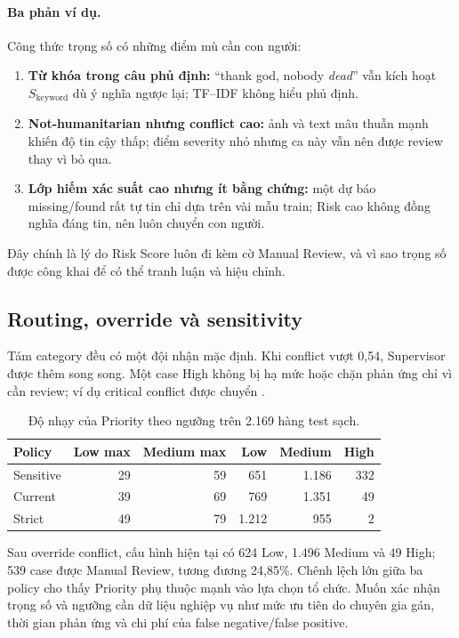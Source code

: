 \paragraph{Ba phản ví dụ.} Công thức trọng số có những điểm mù cần con người:
\begin{enumerate}[leftmargin=*]
  \item \textbf{Từ khóa trong câu phủ định:} ``thank god, nobody \emph{dead}''
        vẫn kích hoạt \(S_{\mathrm{keyword}}\) dù ý nghĩa ngược lại; TF--IDF
        không hiểu phủ định.
  \item \textbf{Not-humanitarian nhưng conflict cao:} ảnh và text mâu thuẫn mạnh
        khiến độ tin cậy thấp; điểm severity nhỏ nhưng ca này vẫn nên được review
        thay vì bỏ qua.
  \item \textbf{Lớp hiếm xác suất cao nhưng ít bằng chứng:} một dự báo
        missing/found rất tự tin chỉ dựa trên vài mẫu train; Risk cao không đồng
        nghĩa đáng tin, nên luôn chuyển con người.
\end{enumerate}
Đây chính là lý do Risk Score luôn đi kèm cờ Manual Review, và vì sao trọng số
được công khai để có thể tranh luận và hiệu chỉnh.

\subsection{Routing, override và sensitivity}

Tám category đều có một đội nhận mặc định. Khi conflict vượt 0,54, Supervisor
được thêm song song. Một case High không bị hạ mức hoặc chặn phản ứng chỉ vì
cần review; ví dụ critical conflict được chuyển
.

\begin{table}[H]\centering\small
\caption{Độ nhạy của Priority theo ngưỡng trên 2.169 hàng test sạch.}
\begin{tabular}{lrrrrr}
\toprule
\textbf{Policy} & \textbf{Low max} & \textbf{Medium max} &
\textbf{Low} & \textbf{Medium} & \textbf{High}\\
\midrule
Sensitive & 29 & 59 & 651 & 1.186 & 332\\
Current & 39 & 69 & 769 & 1.351 & 49\\
Strict & 49 & 79 & 1.212 & 955 & 2\\
\bottomrule
\end{tabular}
\end{table}

Sau override conflict, cấu hình hiện tại có 624 Low, 1.496 Medium và 49 High;
539 case được Manual Review, tương đương 24,85\%. Chênh lệch lớn giữa ba policy
cho thấy Priority phụ thuộc mạnh vào lựa chọn tổ chức. Muốn xác nhận trọng số
và ngưỡng cần dữ liệu nghiệp vụ như mức ưu tiên do chuyên gia gán, thời gian
phản ứng và chi phí của false negative/false positive.

